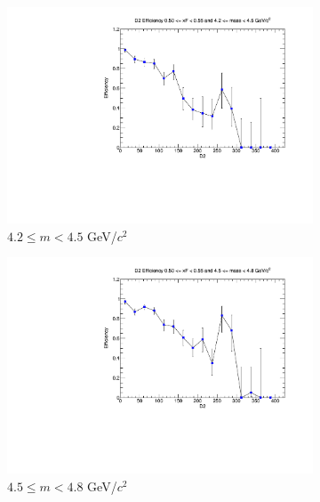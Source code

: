 \begin{figure}[p]
    \centering
    \begin{subfigure}[b]{0.32\textwidth}
        \centering
        \includegraphics[width=\textwidth]{./kTrackerEfficiencyPlots/D2_Efficiency_xF10_mass0.pdf}
        \caption{$4.2 \leq m < 4.5$ GeV/$c^2$}
        \label{fig:xF10_mass0}
    \end{subfigure}
    \hfill
    \begin{subfigure}[b]{0.32\textwidth}
        \centering
        \includegraphics[width=\textwidth]{./kTrackerEfficiencyPlots/D2_Efficiency_xF10_mass1.pdf}
        \caption{$4.5 \leq m < 4.8$ GeV/$c^2$}
        \label{fig:xF10_mass1}
    \end{subfigure}
    \hfill
    \begin{subfigure}[b]{0.32\textwidth}

\end{subfigure}
\end{figure}
